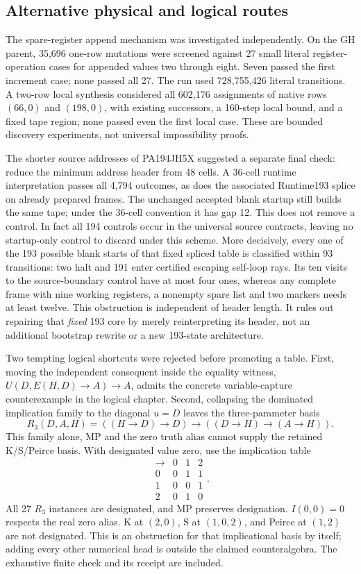 \subsection{Alternative physical and logical routes}

The spare-register append mechanism was investigated independently.
On the GH parent, 35,696 one-row mutations were screened against 27 small
literal register-operation cases for appended values two through eight.
Seven passed the first increment case; none passed all 27.  The run used
728,755,426 literal transitions.  A two-row local synthesis considered
all 602,176 assignments of native rows $(66,0)$ and $(198,0)$, with
existing successors, a 160-step local bound, and a fixed tape region;
none passed even the first local case.  These are bounded discovery
experiments, not universal impossibility proofs.

The shorter source addresses of PA194JH5X suggested a separate final
check: reduce the minimum address header from 48 cells.  A 36-cell
runtime interpretation passes all 4,794 outcomes, as does the associated
Runtime193 splice on already prepared frames.  The unchanged accepted
blank startup still builds the same tape; under the 36-cell convention
it has gap 12.  This does not remove a control.  In fact all 194 controls
occur in the universal source contracts, leaving no startup-only control
to discard under this scheme.  More decisively, every one of the 193
possible blank starts of that fixed spliced table is classified within
93 transitions: two halt and 191 enter certified escaping self-loop rays.
Its ten visits to the source-boundary control have at most four ones,
whereas any complete frame with nine working registers, a nonempty spare
list and two markers needs at least twelve.  This obstruction is
independent of header length.  It rules out repairing that \emph{fixed}
193 core by merely reinterpreting its header, not an additional bootstrap
rewrite or a new 193-state architecture.

Two tempting logical shortcuts were rejected before promoting a table.
First, moving the independent consequent inside the equality witness,
$U(D,E(H,D)\to A)\to A$, admits the concrete variable-capture
counterexample in the logical chapter.  Second, collapsing the dominated
implication family to the diagonal $u=D$ leaves the three-parameter basis
\[
 R_3(D,A,H)=((H\to D)\to D)\to((D\to H)\to(A\to H)).
\]
This family alone, MP and the zero truth alias cannot supply the retained
K/S/Peirce basis.  With designated value zero, use the implication table
\[
 \begin{array}{c|ccc}
 \to&0&1&2\\\hline
 0&0&1&1\\1&0&0&1\\2&0&1&0
 \end{array}.
\]
All 27 $R_3$ instances are designated, and MP preserves designation.
$I(0,0)=0$ respects the real zero alias.  K at $(2,0)$, S at $(1,0,2)$,
and Peirce at $(1,2)$ are not designated.  This is an obstruction for
that implicational basis by itself; adding every other numerical head
is outside the claimed counteralgebra.  The exhaustive finite check and
its receipt are included.

